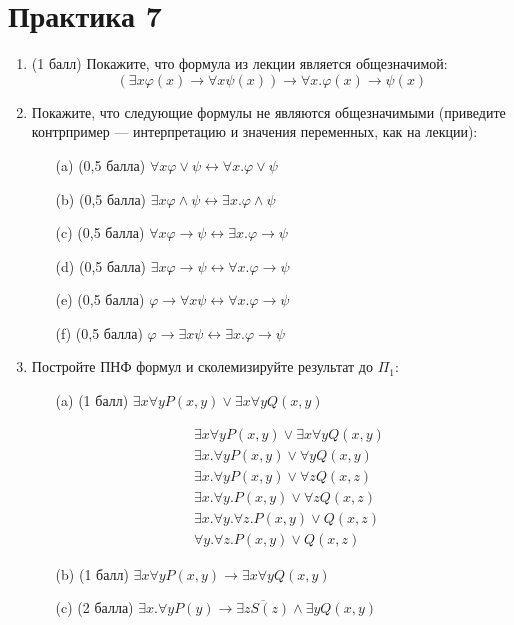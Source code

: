 \section{Практика 7}
\begin{enumerate}
    \item (1 балл) Покажите, что формула из лекции является общезначимой:
    $$(\exists x\varphi(x) \rightarrow \forall x\psi(x)) \rightarrow \forall x. \varphi(x) \rightarrow \psi(x)$$
    \item Покажите, что следующие формулы не являются общезначимыми (приведите контрпример — интерпретацию и значения переменных, как на лекции):
    \begin{itemize}
        \item[(a)] (0,5 балла) $\forall x\varphi \lor \psi \leftrightarrow \forall x. \varphi \lor \psi$
        \item[(b)] (0,5 балла) $\exists x\varphi \land \psi \leftrightarrow \exists x. \varphi \land \psi$
        \item[(c)] (0,5 балла) $\forall x\varphi \rightarrow \psi \leftrightarrow \exists x. \varphi \rightarrow \psi$
        \item[(d)] (0,5 балла) $\exists x\varphi \rightarrow \psi \leftrightarrow \forall x. \varphi \rightarrow \psi$
        \item[(e)] (0,5 балла) $\varphi \rightarrow \forall x\psi \leftrightarrow \forall x. \varphi \rightarrow \psi$
        \item[(f)] (0,5 балла) $\varphi \rightarrow \exists x\psi \leftrightarrow \exists x. \varphi \rightarrow \psi$
    \end{itemize}
    \item Постройте ПНФ формул и сколемизируйте результат до $\Pi_1$:
    \begin{itemize}
        \item[(a)] (1 балл) $\exists x\forall y P(x, y) \lor \exists x\forall y Q(x, y)$
        \begin{solution}
            \begin{align*}
                &\exists x\forall y P(x, y) \lor \exists x\forall y Q(x, y) \\
                &\exists x . \forall y P(x, y) \lor \forall y Q(x, y) \\
                &\exists x . \forall y P(x, y) \lor \forall z Q(x, z) \\
                &\exists x . \forall y. P(x, y) \lor \forall z Q(x, z) \\
                &\exists x . \forall y. \forall z . P(x, y) \lor Q(x, z) \\
                &\forall y. \forall z . P(x, y) \lor Q(x, z)
            \end{align*}
        \end{solution}
        \item[(b)] (1 балл) $\exists x\forall y P(x, y) \rightarrow \exists x\forall y Q(x, y)$
        \item[(c)] (2 балла) $\exists x. \forall y P(y) \rightarrow \overline{\exists z S(z)} \land \exists y Q(x, y)$
    \end{itemize}
\end{enumerate}
\clearpage
